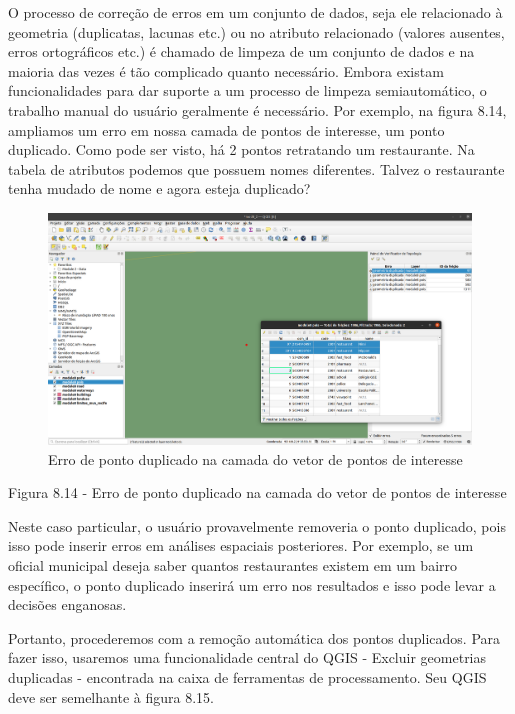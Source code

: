 \documentclass[
  portuguese,
]{krantz}
\begin{document}
O processo de correção de erros em um conjunto de dados, seja ele relacionado à geometria (duplicatas, lacunas etc.) ou no atributo relacionado (valores ausentes, erros ortográficos etc.) é chamado de limpeza de um conjunto de dados e na maioria das vezes é tão complicado quanto necessário. Embora existam funcionalidades para dar suporte a um processo de limpeza semiautomático, o trabalho manual do usuário geralmente é necessário. Por exemplo, na figura 8.14, ampliamos um erro em nossa camada de pontos de interesse, um ponto duplicado. Como pode ser visto, há 2 pontos retratando um restaurante. Na tabela de atributos podemos que possuem nomes diferentes. Talvez o restaurante tenha mudado de nome e agora esteja duplicado?

\begin{figure}
\centering
\includegraphics{media/modulo8/fig814.png}
\caption{Erro de ponto duplicado na camada do vetor de pontos de interesse}
\end{figure}

Figura 8.14 - Erro de ponto duplicado na camada do vetor de pontos de interesse

Neste caso particular, o usuário provavelmente removeria o ponto duplicado, pois isso pode inserir erros em análises espaciais posteriores. Por exemplo, se um oficial municipal deseja saber quantos restaurantes existem em um bairro específico, o ponto duplicado inserirá um erro nos resultados e isso pode levar a decisões enganosas.

Portanto, procederemos com a remoção automática dos pontos duplicados. Para fazer isso, usaremos uma funcionalidade central do QGIS - Excluir geometrias duplicadas - encontrada na caixa de ferramentas de processamento. Seu QGIS deve ser semelhante à figura 8.15.
\end{document}
